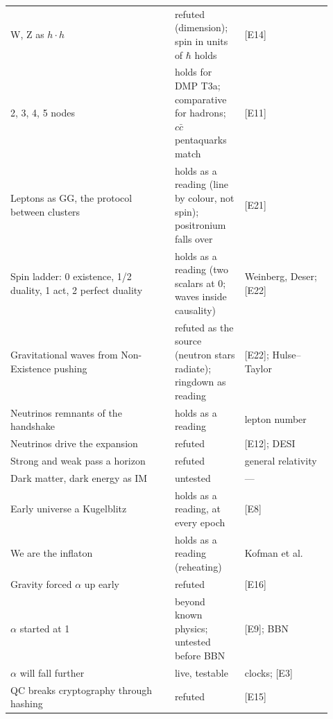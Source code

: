 \documentclass[11pt,a4paper]{article}
\theoremstyle{definition}
\theoremstyle{remark}
\newcommand{\chk}[1]{\textsf{[#1]}}
\begin{document}
\begin{center}
\begin{longtable}{@{}p{0.47\linewidth}p{0.2\linewidth}p{0.25\linewidth}@{}}
W, Z as $h\cdot h$ & refuted (dimension); spin in units of $\hbar$ holds & \chk{E14} \\
2, 3, 4, 5 nodes & holds for DMP T3a; comparative for hadrons; $c\bar c$ pentaquarks match & \chk{E11} \\
Leptons as GG, the protocol between clusters & holds as a reading (line by colour, not spin); positronium falls over & \chk{E21} \\
Spin ladder: 0 existence, 1/2 duality, 1 act, 2 perfect duality & holds as a reading (two scalars at 0; waves inside causality) & Weinberg, Deser; \chk{E22} \\
Gravitational waves from Non-Existence pushing & refuted as the source (neutron stars radiate); ringdown as reading & \chk{E22}; Hulse--Taylor \\
Neutrinos remnants of the handshake & holds as a reading & lepton number \\
Neutrinos drive the expansion & refuted & \chk{E12}; DESI \\
Strong and weak pass a horizon & refuted & general relativity \\
Dark matter, dark energy as IM & untested & --- \\
Early universe a Kugelblitz & holds as a reading, at every epoch & \chk{E8} \\
We are the inflaton & holds as a reading (reheating) & Kofman et al. \\
Gravity forced $\alpha$ up early & refuted & \chk{E16} \\
$\alpha$ started at 1 & beyond known physics; untested before BBN & \chk{E9}; BBN \\
$\alpha$ will fall further & live, testable & clocks; \chk{E3} \\
QC breaks cryptography through hashing & refuted & \chk{E15} \\
\bottomrule
\end{longtable}
\end{center}
\end{document}
